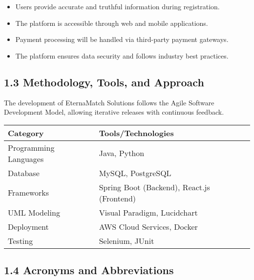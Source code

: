 \begin{itemize}
\item
  Users provide accurate and truthful information during registration.
\item
  The platform is accessible through web and mobile applications.
\item
  Payment processing will be handled via third-party payment gateways.
\item
  The platform ensures data security and follows industry best
  practices.
\end{itemize}

\subsection{\texorpdfstring{1.3 \textbf{Methodology, Tools, and
Approach}}{1.3 Methodology, Tools, and Approach}}\label{methodology-tools-and-approach-1}

The development of EternaMatch Solutions follows the Agile Software
Development Model, allowing iterative releases with continuous feedback.

\begin{longtable}[]{@{}
  >{\raggedright\arraybackslash}p{}
  >{\raggedright\arraybackslash}p{}@{}}
\toprule\noalign{}
\begin{minipage}[b]{\linewidth}\raggedright
\textbf{Category}
\end{minipage} & \begin{minipage}[b]{\linewidth}\raggedright
\textbf{Tools/Technologies}
\end{minipage} \\
\midrule\noalign{}
\endhead
\bottomrule\noalign{}
\endlastfoot
Programming Languages & Java, Python \\
Database & MySQL, PostgreSQL \\
Frameworks & Spring Boot (Backend), React.js (Frontend) \\
UML Modeling & Visual Paradigm, Lucidchart \\
Deployment & AWS Cloud Services, Docker \\
Testing & Selenium, JUnit \\
\end{longtable}

\subsection{\texorpdfstring{1.4 \textbf{Acronyms and
Abbreviations}}{1.4 Acronyms and Abbreviations}}\label{acronyms-and-abbreviations-1}

